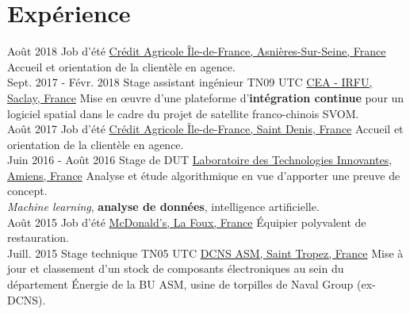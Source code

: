 \documentclass[letterpaper]{twentysecondcv} %
\begin{document}
\section{Expérience}

\begin{twenty} %
    \twentyitem
    	{Août 2018}
		{}
        {Job d'été}
        {\href{https://ca-paris.com/}{Crédit Agricole Île-de-France, Asnières-Sur-Seine, France}}
        {}
        {Accueil et orientation de la clientèle en agence.}
    \\
    \twentyitem
    	{Sept. 2017 -}
		{Févr. 2018}
        {Stage assistant ingénieur TN09 UTC}
        {\href{http://irfu.cea.fr/}{CEA - IRFU, Saclay, France}}
        {}
        {Mise en œuvre d'une plateforme d'\textbf{intégration continue} pour un logiciel spatial dans le cadre du projet de satellite franco-chinois SVOM.}
    \\
    \twentyitem
    	{Août 2017}
		{}
        {Job d'été}
        {\href{https://ca-paris.com/}{Crédit Agricole Île-de-France, Saint Denis, France}}
        {}
        {Accueil et orientation de la clientèle en agence.}
    \\
	\twentyitem
    	{Juin 2016 -}
		{Août 2016}
        {Stage de DUT}
        {\href{http://lti-picardie.fr/}{Laboratoire des Technologies Innovantes, Amiens, France}}
        {}
        {Analyse et étude algorithmique en vue d'apporter une preuve de concept.\\\textit{Machine learning}, \textbf{analyse de données}, intelligence artificielle.}
    \\   
    \twentyitem
   		{Août 2015}
        {}
        {Job d'été}
        {\href{https://www.restaurants.mcdonalds.fr/mcdonalds-gassin}{McDonald's, La Foux, France}}
        {}
        {Équipier polyvalent de restauration.}
     \\
     \twentyitem
   		{Juill. 2015}
		{}
        {Stage technique TN05 UTC}
        {\href{https://www.naval-group.com/fr/}{DCNS ASM, Saint Tropez, France}}
        {}
        {Mise à jour et classement d'un stock de composants électroniques au sein du département Énergie de la BU ASM, usine de torpilles de Naval Group (ex-DCNS).}
        
\end{twenty}

\end{document}

